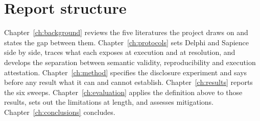 \section{Report structure}
\label{sec:structure}

Chapter~\ref{ch:background} reviews the five literatures the project draws on and states the
gap between them. Chapter~\ref{ch:protocols} sets Delphi and Sapience side by side, traces
what each exposes at execution and at resolution, and develops the separation between
semantic validity, reproducibility and execution attestation. Chapter~\ref{ch:method}
specifies the disclosure experiment and says before any result what it can and cannot
establish. Chapter~\ref{ch:results} reports the six sweeps. Chapter~\ref{ch:evaluation}
applies the definition above to those results, sets out the limitations at length, and
assesses mitigations. Chapter~\ref{ch:conclusions} concludes.
